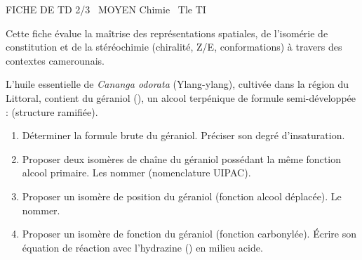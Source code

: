 \documentclass[11pt]{article}
\begin{document}
\begin{tcolorbox}[enhanced,colback=popink,colframe=popink,arc=10pt,boxrule=0pt,left=12pt,right=12pt,top=9pt,bottom=9pt]
{\color{white}\popxbold\small FICHE DE TD 2/3 \textbullet\ MOYEN \hfill Chimie \textbullet\ Tle TI\par}
\end{tcolorbox}
\vspace{4pt}
\noindent Cette fiche évalue la maîtrise des représentations spatiales, de l'isomérie de constitution et de la stéréochimie (chiralité, Z/E, conformations) à travers des contextes camerounais.

\begin{exercice}
L'huile essentielle de \textit{Cananga odorata} (Ylang-ylang), cultivée dans la région du Littoral, contient du géraniol (), un alcool terpénique de formule semi-développée :  (structure ramifiée).
\begin{enumerate}
    \item Déterminer la formule brute du géraniol. Préciser son degré d'insaturation.
    \item Proposer deux isomères de chaîne du géraniol possédant la même fonction alcool primaire. Les nommer (nomenclature UIPAC).
    \item Proposer un isomère de position du géraniol (fonction alcool déplacée). Le nommer.
    \item Proposer un isomère de fonction du géraniol (fonction carbonylée). Écrire son équation de réaction avec l'hydrazine () en milieu acide.
\end{enumerate}
\end{exercice}
\end{document}
